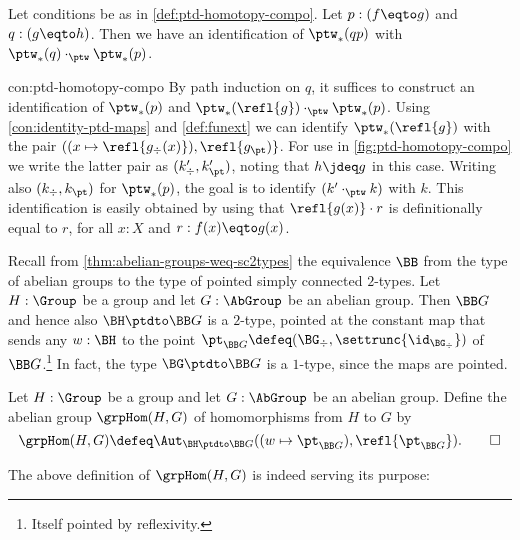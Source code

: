 \begin{construction}\label{con:ptd-homotopy-compo}
Let conditions be as in \cref{def:ptd-homotopy-compo}.
Let $p:(f\eqto g)$ and $q:(g\eqto h)$.
Then we have an identification of $\ptw_*(qp)$ with
$\ptw_*(q) \cdot_{\ptw} \ptw_*(p)$.
\end{construction}
\begin{implementation}{con:ptd-homotopy-compo}
By path induction on $q$, it suffices to construct an identification
of $\ptw_*(p)$ and $\ptw_*(\refl{g}) \cdot_{\ptw} \ptw_*(p)$.
Using \cref{con:identity-ptd-maps} and \cref{def:funext} we
can identify $\ptw_*(\refl{g})$ with the pair
$((x\mapsto\refl{g_\div(x)}),\refl{g_\pt)}$. 
For use in \cref{fig:ptd-homotopy-compo} we write the latter
pair as $(k'_\div,k'_\pt)$, noting that $h\jdeq g$ in this case.
Writing also $(k_\div,k_\pt)$ for $\ptw_*(p)$, the goal is to
identify $(k'\cdot_{\ptw} k)$ with $k$.
This identification is easily obtained by using
that $\refl{g(x)}\cdot r$ is definitionally equal to $r$,
for all $x:X$ and $r:f(x)\eqto g(x)$.
\end{implementation}

Recall from \cref{thm:abelian-groups-weq-sc2types} the equivalence
$\BB$ from the type of abelian groups to the type of pointed
simply connected $2$-types. Let $H:\Group$ be a group and let
$G:\AbGroup$ be an abelian group.
Then $\BB G$ and hence also $\BH\ptdto\BB G$ is a $2$-type, 
pointed at the constant map that sends any $w:\BH$ to the 
point $\pt_{\BB G}\defeq (\BG_\div,\settrunc{\id_{\BG_\div}})$ 
of $\BB G$.\footnote{Itself pointed by reflexivity.} In fact,
the type $\BG\ptdto\BB G$ is a $1$-type, since the maps are pointed.

\begin{definition}\label{def:AbHomgroup}
Let $H:\Group$ be a group and let $G:\AbGroup$ be an abelian group. 
Define the abelian group $\grpHom(H,G)$
of homomorphisms from $H$ to $G$ by 
\[
\grpHom(H,G) \defeq \Aut_{\BH\ptdto\BB G}
((w \mapsto \pt_{\BB G}),\refl{\pt_{\BB G}}).\qedhere
\]
\end{definition}

The above definition of $\grpHom(H,G)$ is indeed serving its purpose:

